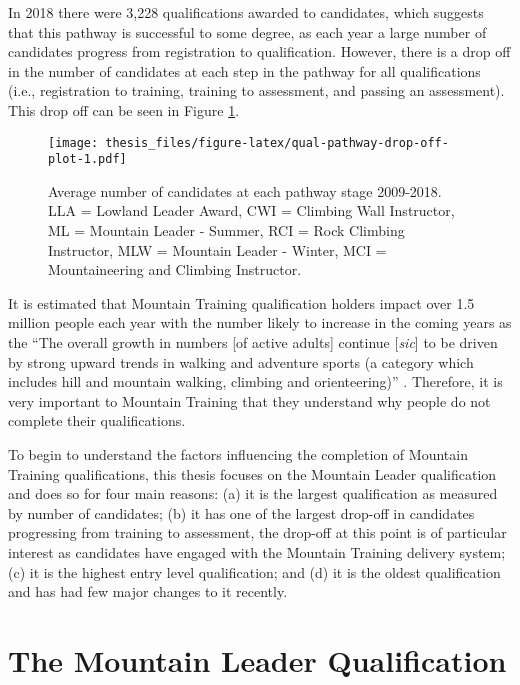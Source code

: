 \documentclass[
  12pt,
  a4paper,
]{book}
\begin{document}
In 2018 there were 3,228 qualifications awarded to candidates, which suggests that this pathway is successful to some degree, as each year a large number of candidates progress from registration to qualification. However, there is a drop off in the number of candidates at each step in the pathway for all qualifications (i.e., registration to training, training to assessment, and passing an assessment). This drop off can be seen in Figure \ref{fig:qual-pathway-drop-off-plot}.

\begin{figure}
\centering
\texttt{[image: thesis\_files/figure-latex/qual-pathway-drop-off-plot-1.pdf]}
\caption{\label{fig:qual-pathway-drop-off-plot}Average number of candidates at each pathway stage 2009-2018. LLA = Lowland Leader Award, CWI = Climbing Wall Instructor, ML = Mountain Leader - Summer, RCI = Rock Climbing Instructor, MLW = Mountain Leader - Winter, MCI = Mountaineering and Climbing Instructor.}
\end{figure}

It is estimated that Mountain Training qualification holders impact over 1.5 million people each year \citep{MTE2019} with the number likely to increase in the coming years as the ``The overall growth in numbers {[}of active adults{]} continue {[}\emph{sic}{]} to be driven by strong upward trends in walking and adventure sports (a category which includes hill and mountain walking, climbing and orienteering)'' \citep[p 14]{SportEngland2020}. Therefore, it is very important to Mountain Training that they understand why people do not complete their qualifications.

To begin to understand the factors influencing the completion of Mountain Training qualifications, this thesis focuses on the Mountain Leader qualification and does so for four main reasons: (a) it is the largest qualification as measured by number of candidates; (b) it has one of the largest drop-off in candidates progressing from training to assessment, the drop-off at this point is of particular interest as candidates have engaged with the Mountain Training delivery system; (c) it is the highest entry level qualification; and (d) it is the oldest qualification and has had few major changes to it recently.

\hypertarget{the-mountain-leader-qualification}{%
\section{The Mountain Leader Qualification}\label{the-mountain-leader-qualification}}
\end{document}
